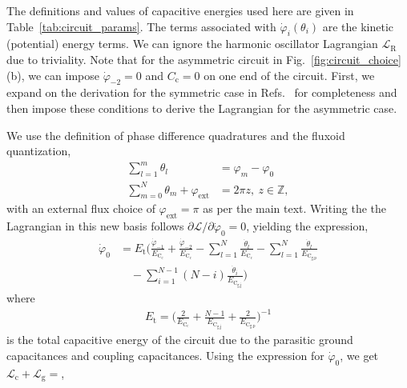 \documentclass[%
reprint,
superscriptaddress,
 amsmath,amssymb,
 aps,
 prx,
longbibliography,
floatfix,
]{revtex4-2}
\begin{document}
The definitions and values of capacitive energies used here are given in Table~\ref{tab:circuit_params}. The terms associated with $\dot{\varphi}_i (\theta_i)$ are the kinetic (potential) energy terms. We can ignore the harmonic oscillator Lagrangian $\mathcal{L}_\textrm{R}$ due to triviality. Note that for the asymmetric circuit in Fig.~\ref{fig:circuit_choice}(b), we can impose $\dot{\varphi}_{-2}=0$ and $C_\textrm{c}=0$ on one end of the circuit. First, we expand on the derivation for the symmetric case in Refs.~\cite{ferguson2013symmetries,viola2015collective} for completeness and then impose these conditions to derive the Lagrangian for the asymmetric case.

We use the definition of phase difference quadratures and the fluxoid quantization, 
\begin{align}
\sum_{l=1}^m\theta_l&=\varphi_m-\varphi_0\\
\sum_{m=0}^N \theta_m+\varphi_\mathrm{ext}&=2\pi z, \ z\in\mathbb{Z},
\end{align}
 with an external flux choice of $\varphi_{\mathrm{ext}}=\pi$ as per the main text. Writing the the Lagrangian in this new basis follows $\partial \mathcal{L}/\partial \dot{\varphi}_0=0$, yielding the expression,
\begin{align}
\dot{\varphi}_0&=E_{\textrm{t}}\Big(\frac{\dot{\varphi}_{-1}}{E_{\textrm{C}_\textrm{c}}}+\frac{\dot{\varphi}_{-2}}{E_{\textrm{C}_\textrm{c}}}-\sum_{l=1}^{N}\frac{\dot{\theta}_l}{E_{\textrm{C}_\textrm{c}}}-\sum_{l=1}^{N}\frac{\dot{\theta}_l}{E_{\textrm{C}_\textrm{g,p}}}\nonumber\\&\quad-\sum_{i=1}^{N-1}(N-i)\frac{\dot{\theta}_i}{E_{\textrm{C}_\textrm{g,j}}}\Big)
\end{align}
where
\begin{align}
E_\textrm{t}=\Big(\frac{2}{E_{\textrm{C}_\textrm{c}}}+\frac{N-1}{E_{\textrm{C}_\textrm{g,j}}}+\frac{2}{E_{\textrm{C}_\textrm{g,p}}}\Big)^{-1}\label{eq:tot_cap}
\end{align}
is the total capacitive energy of the circuit due to the parasitic ground capacitances and coupling capacitances. Using the expression for $\dot{\varphi}_0$, we get $\mathcal{L}_\textrm{c}+\mathcal{L}_\textrm{g}=$,
\end{document}
